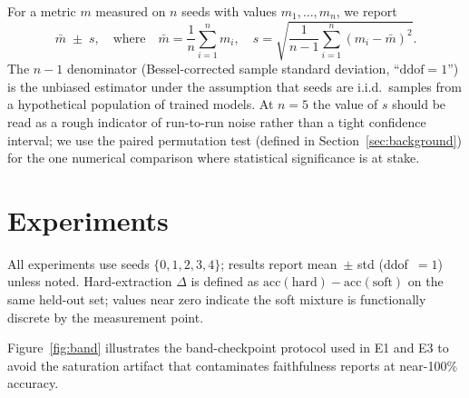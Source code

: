 \documentclass{article}
\begin{document}
For a metric $m$ measured on $n$ seeds with values $m_1, \ldots, m_n$, we report
\begin{equation*}
  \bar{m} \;\pm\; s, \quad \text{where} \quad \bar{m} = \frac{1}{n}\sum_{i=1}^{n} m_i, \quad s = \sqrt{\frac{1}{n-1}\sum_{i=1}^{n}(m_i - \bar{m})^2}.
\end{equation*}
The $n - 1$ denominator (Bessel-corrected sample standard deviation, ``$\mathrm{ddof}{=}1$'') is the unbiased estimator under the assumption that seeds are i.i.d.\ samples from a hypothetical population of trained models.
At $n = 5$ the value of $s$ should be read as a rough indicator of run-to-run noise rather than a tight confidence interval; we use the paired permutation test (defined in Section~\ref{sec:background}) for the one numerical comparison where statistical significance is at stake.

\section{Experiments}
\label{sec:experiments}

All experiments use seeds $\{0, 1, 2, 3, 4\}$; results report mean~$\pm$ std (ddof~$=1$) unless noted.
Hard-extraction $\Delta$ is defined as $\mathrm{acc}(\text{hard}) - \mathrm{acc}(\text{soft})$ on the same held-out set; values near zero indicate the soft mixture is functionally discrete by the measurement point.

Figure~\ref{fig:band} illustrates the band-checkpoint protocol used in E1 and E3 to avoid the saturation artifact that contaminates faithfulness reports at near-100\% accuracy.
\end{document}

